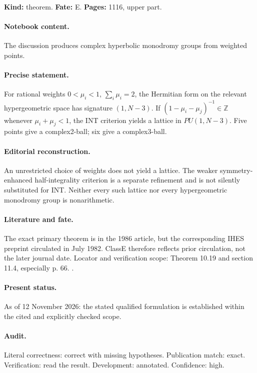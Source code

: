 \label{item:1983-597.6}

\noindent\textbf{Kind:} theorem. \textbf{Fate:} E. \textbf{Pages:} 1116, upper part.\par

\paragraph{Notebook content.} The discussion produces complex hyperbolic monodromy groups from weighted points.

\paragraph{Precise statement.} For rational weights \(0<\mu_i<1\), \(\sum_i\mu_i=2\), the Hermitian form on the relevant hypergeometric space has signature \((1,N-3)\). If \((1-\mu_i-\mu_j)^{-1}\in\mathbb Z\) whenever \(\mu_i+\mu_j<1\), the INT criterion yields a lattice in \(PU(1,N-3)\). Five points give a complex2-ball; six give a complex3-ball.

\paragraph{Editorial reconstruction.} An unrestricted choice of weights does not yield a lattice. The weaker symmetry-enhanced half-integrality criterion is a separate refinement and is not silently substituted for INT. Neither every such lattice nor every hypergeometric monodromy group is nonarithmetic.

\paragraph{Literature and fate.} The exact primary theorem is in the 1986 article, but the corresponding IHES preprint circulated in July 1982. ClassE therefore reflects prior circulation, not the later journal date. Locator and verification scope: Theorem 10.19 and section 11.4, especially p. 66. \cite{delignemostow1986monodromy}.

\paragraph{Present status.} As of 12 November 2026: the stated qualified formulation is established within the cited and explicitly checked scope.

\paragraph{Audit.} Literal correctness: correct with missing hypotheses. Publication match: exact. Verification: read the result. Development: annotated. Confidence: high.

